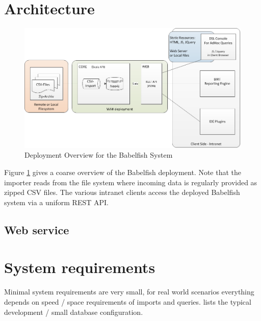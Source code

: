 \section{Architecture}
\begin{figure}[htbp]
\centering
\includegraphics[width=\textwidth]{./graphics/DeploymentOverview}
\caption{Deployment Overview for the Babelfish System}
\label{fig:DeploymentOverview}
\end{figure}
Figure \ref{fig:DeploymentOverview} gives a coarse overview of the Babelfish deployment.
Note that the importer reads from the file system where incoming data is regularly provided as zipped CSV files.
The various intranet clients access the deployed Babelfish system via a uniform REST API.

\subsection{Web service}\label{sec:web}
\todo

\section{System requirements}
Minimal system requirements are very small, for real world scenarios everything depends on speed / space requirements of imports and queries.  lists the typical development / small database configuration.


